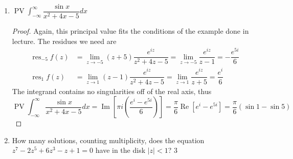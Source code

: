 \documentclass[10pt]{article}
\newcommand{\Int}{\displaystyle\int}
\DeclareMathOperator*{\re}{Re}
\DeclareMathOperator*{\im}{Im}
\DeclareMathOperator*{\res}{res}
\DeclareMathOperator*{\PV}{PV}
\begin{document}
\begin{enumerate}
\begin{proof}
Combining the substitution $u = 2x$ with the fact that the integrand is an even function, we have
$$
\Int_0^{\infty} \dfrac{x \sin 2x}{x^2 + 3} dx =\frac12 \Int_{-\infty}^{\infty} \dfrac{x \sin 2x}{x^2 + 3} dx = \frac14 \Int_{-\infty}^{\infty} \dfrac{\frac{u}{2} \sin u}{(\frac{u}{2})^2 + 3} du = \frac12 \Int_{-\infty}^{\infty} \dfrac{u \sin u}{u^2 + 12} du.
$$
This integral satisfies the hypotheses of the example done in lecture: the polynomial in the denominator has degree strictly greater than that in the numerator, and all singularities lie off the real axis.  Therefore, we can apply the proven solution.  First, we compute the residue of interest as
\begin{align*}
\res\nolimits_{i\sqrt{12}} \frac{z}{z^2 + 12}e^{iz} &= \lim_{z \rightarrow i\sqrt{12}} \frac{z}{z + i\sqrt{12}}e^{iz} = \frac{i \sqrt{12}}{2i \sqrt{12}}e^{-\sqrt{12}} = \frac{e^{-\sqrt{12}}}{2}.
\end{align*}
Since this is the only singularity in the upper half-plane, the integral equals
$$
\Int_0^{\infty} \dfrac{x \sin 2x}{x^2 + 3} dx = \frac12 \im \left[2\pi i\frac{e^{-\sqrt{12}}}{2} \right] = \boxed{\frac{\pi e^{-\sqrt{12}}}{2}}
$$

\end{proof}

\item $\PV \Int_{-\infty}^\infty \dfrac{\sin x}{x^2 + 4x - 5} dx $

\begin{proof}
Again, this principal value fits the conditions of the example done in lecture.  The residues we need are
\begin{align*}
\res\nolimits_{-5} f(z) &= \lim_{z \rightarrow -5}(z+5) \dfrac{e^{iz}}{z^2 + 4z - 5}  =\lim_{z \rightarrow -5} \dfrac{e^{iz}}{z-1} = -\dfrac{e^{5i}}{6}
\\
\res\nolimits_{1} f(z) &= \lim_{z \rightarrow 1}(z-1) \dfrac{e^{iz}}{z^2 + 4z - 5}  =\lim_{z \rightarrow 1} \dfrac{e^{iz}}{z+5} = \dfrac{e^{i}}{6}
\end{align*}
The integrand contains no singularities off of the real axis, thus
$$
\PV \Int_{-\infty}^\infty \dfrac{\sin x}{x^2 + 4x - 5} dx
=
\im \left[\pi i \left( \dfrac{e^i - e^{5i}}{6} \right) \right]
=
\dfrac{\pi}{6} \re \left[ e^i - e^{5i} \right] = \boxed{\frac{\pi}{6}\left( \sin 1 - \sin 5 \right)}
$$
\end{proof}

\item How many solutions, counting multiplicity, does the equation $z^7 - 2z^5 + 6z^3 - z + 1 = 0$ have in the disk $|z| < 1$? \hspace{1cm} $\boxed{3}$


\end{enumerate}
\end{document}

